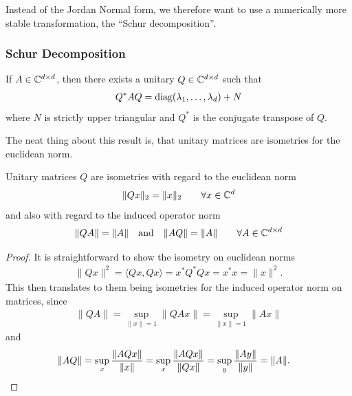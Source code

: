 Instead of the Jordan Normal form, we therefore want to use a numerically more
stable transformation, the ``Schur decomposition''.

\subsubsection{Schur Decomposition}

\begin{theorem}
	If \(A\in\mathbb{C}^{d\times d}\), then there exists a unitary
	\(Q\in\mathbb{C}^{d\times d}\) such that
	\begin{align*}
		Q^* A Q = \text{diag}(\lambda_1, \dots, \lambda_d) + N
	\end{align*}
	where \(N\) is strictly upper triangular and \(Q^*\) is the conjugate
	transpose of \(Q\).
\end{theorem}

The neat thing about this result is, that unitary matrices are isometries for the
euclidean norm.

\begin{lemma}
	\label{lem: unitary matrices are isometries}
	Unitary matrices \(Q\) are isometries with regard to the euclidean norm
	\begin{align*}
		\|Qx\|_2 = \|x\|_2 \qquad \forall x\in\mathbb{C}^d
	\end{align*}	
	and also with regard to the induced operator norm
	\begin{align*}
		\|QA\| = \|A\| \quad \text{and} \quad \|AQ\| = \|A\|
		\qquad \forall A \in\mathbb{C}^{d\times d}
	\end{align*}
\end{lemma}
\begin{proof}
	It is straightforward to show the isometry on euclidean norms
	\begin{align*}
		\|Qx\|^2 = \langle Qx, Qx\rangle = x^* Q^* Q x = x^* x = \|x\|^2.
	\end{align*}
	This then translates to them being isometries for the induced operator norm
	on matrices, since
	\begin{align*}
		\|QA\| = \sup_{\|x\|=1} \|QAx\| = \sup_{\|x\|=1} \|Ax\|
	\end{align*}
	and
	\begin{align*}
		\|AQ\|
		&= \sup_{x} \frac{\|AQx\|}{\|x\|} = \sup_{x} \frac{\|AQx\|}{\|Qx\|}
		= \sup_{y} \frac{\|Ay\|}{\|y\|} = \|A\|.
		\qedhere
	\end{align*}
\end{proof}

